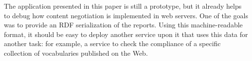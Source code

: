 \documentclass{../templates/llncs}
\begin{document}

The application presented in this paper is still a prototype, but  
it already helps to debug how content negotiation is implemented in web servers. One of the 
goals was to provide an RDF serialization of the reports. Using this machine-readable 
format, it should be easy to deploy another service upon it that uses this data for 
another task: for example, a service to check the compliance of a specific collection 
of vocabularies published on the Web.




\end{document}
